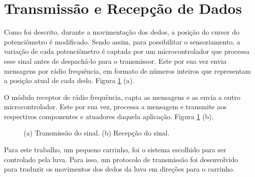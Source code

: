 \documentclass[
	12pt,				%
	openright,			%
	oneside,			%
	a4paper,			%
	english,			%
	brazil				%
	]{abntex2}
\begin{document}
		\section{Transmissão e Recepção de Dados}

			Como foi descrito, durante a movimentação dos dedos, a posição do cursor do potenciômetro é modificado. Sendo assim, para possibilitar o sensoriamento, a variação de cada potenciômetro é captada por um microcontrolador que processa esse sinal antes de despachá-lo para o transmissor. Este por sua vez envia mensagens por rádio frequência, em formato de números inteiros que representam a posição atual de cada dedo. Figura \ref{Fig:transmitter-and-receptor} (a).

			O módulo receptor de rádio frequência, capta as mensagens e as envia a outro microcontrolador. Este por sua vez, processa a mensagem e transmite aos respectivos componentes e atuadores daquela aplicação. Figura \ref{Fig:transmitter-and-receptor} (b).


	\begin{figure}[!htb]
  	\centering
   	\caption{ (a) Transmissão do sinal. (b) Recepção do sinal.}
   	\centering
   	\label{Fig:transmitter-and-receptor}
 		\end{figure}


			Para este trabalho, um pequeno carrinho, foi o sistema escolhido para ser controlado pela luva. Para isso, um protocolo de transmissão foi desenvolvido para traduzir os movimentos dos dedos da luva em direções para o carrinho.
\end{document}
